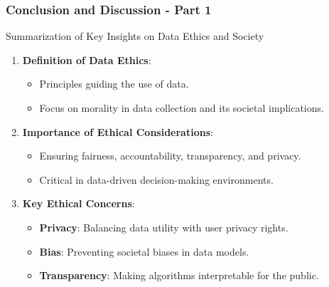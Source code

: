 \documentclass[aspectratio=169]{beamer}
\begin{document}
\begin{frame}[fragile]
    \frametitle{Conclusion and Discussion - Part 1}
    \begin{block}{Summarization of Key Insights on Data Ethics and Society}
        \begin{enumerate}
            \item \textbf{Definition of Data Ethics}:
            \begin{itemize}
                \item Principles guiding the use of data.
                \item Focus on morality in data collection and its societal implications.
            \end{itemize}

            \item \textbf{Importance of Ethical Considerations}:
            \begin{itemize}
                \item Ensuring fairness, accountability, transparency, and privacy.
                \item Critical in data-driven decision-making environments.
            \end{itemize}
            
            \item \textbf{Key Ethical Concerns}:
            \begin{itemize}
                \item \textbf{Privacy}: Balancing data utility with user privacy rights.
                \item \textbf{Bias}: Preventing societal biases in data models.
                \item \textbf{Transparency}: Making algorithms interpretable for the public.
            \end{itemize}
        \end{enumerate}
    \end{block}
\end{frame}
\end{document}
